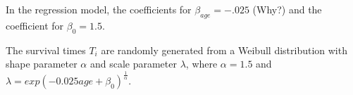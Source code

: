 \documentclass[12pt,letterpaper]{article}
\begin{document}
 In the regression model, the coefficients for $\beta_{age} = -.025$ (Why?) and the coefficient for $\beta_0 = 1.5$.

 The survival times $T_i$ are randomly generated from a Weibull distribution with shape parameter $\alpha$ and scale parameter $\lambda$, where $\alpha=1.5$ and $\lambda=exp(-0.025age+\beta_0)^{\frac{1}{\alpha}}$.


\end{document}
